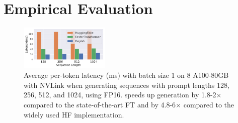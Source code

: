 
\section{Empirical Evaluation}
\label{sec:experitns}


\begin{figure}[]
  \centering
    \includegraphics[width=0.38\textwidth]{figure/experiment/sequence_speed_up_ms.pdf}
    \vspace{-6mm}
  \caption{Average per-token latency (ms) with batch size 1 on 8 A100-80GB with NVLink
  when generating sequences with prompt lengths 128, 256, 512, and 1024, using FP16. \name{} speeds up generation by 1.8-2$\times$ compared to the
  state-of-the-art FT and by 4.8-6$\times$ compared to the widely used
  HF implementation.}
  \label{table:main_latency} 
     \vspace{-4mm}
\end{figure}


